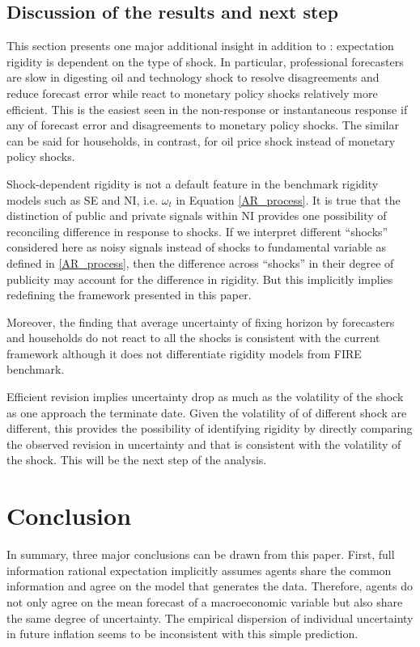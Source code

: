 \documentclass[]{article}
\begin{document}
	\subsection{Discussion of the results and next step}
	
	This section presents one major additional insight in addition to \cite{coibion2012can}: expectation rigidity is dependent on the type of shock. In particular, professional forecasters are slow in digesting oil and technology shock to resolve disagreements and reduce forecast error while react to monetary policy shocks relatively more efficient. This is the easiest seen in the non-response or instantaneous response if any of forecast error and disagreements to monetary policy shocks. The similar can be said for households, in contrast, for oil price shock instead of monetary policy shocks.
	
	Shock-dependent rigidity is not a default feature in the benchmark rigidity models such as SE and NI, i.e. $\omega_t$ in Equation \ref{AR_process}. It is true that the distinction of public and private signals within NI provides one possibility of reconciling difference in response to shocks.  If we interpret different ``shocks'' considered here as noisy signals instead of shocks to fundamental variable as defined in \ref{AR_process}, then the difference across ``shocks'' in their degree of publicity may account for the difference in rigidity.  But this implicitly implies redefining the  framework presented in this paper. 
	
	Moreover, the finding that average uncertainty of fixing horizon by forecasters and households do not react to all the shocks is consistent with the current framework although it does not differentiate rigidity models from FIRE benchmark.  
	
	Efficient revision implies  uncertainty drop as much as the volatility of the shock as one approach the terminate date. Given the volatility of of different shock are different, this provides the possibility of identifying rigidity by directly comparing the observed revision in uncertainty and that is consistent with the volatility of the shock. This will be the next step of the analysis.  
	
	\section{Conclusion}
	
	In summary, three major conclusions can be drawn from this paper.  First, full information rational expectation implicitly assumes agents share the common information and agree on the model that generates the data. Therefore, agents do not only agree on the mean forecast of a macroeconomic variable but also share the same degree of uncertainty. The empirical dispersion of individual uncertainty in future inflation seems to be inconsistent with this simple prediction. 
	
\end{document}
